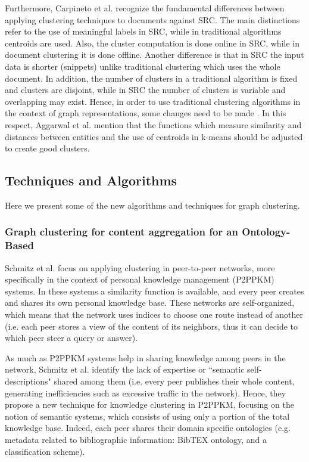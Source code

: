 \documentclass[runningheads]{llncs}
\begin{document}
Furthermore, Carpineto et al. \cite{Carpineto} recognize the fundamental differences between applying clustering techniques to documents against SRC. The main distinctions refer to the use of meaningful labels in SRC, while in traditional algorithms centroids are used. Also, the cluster computation is done online in SRC, while in document clustering it is done offline. Another difference is that in SRC the input data is shorter (snippets) unlike traditional clustering which uses the whole document. In addition, the number of clusters in a traditional algorithm is fixed and clusters are disjoint, while in SRC the number of clusters is variable and overlapping may exist. Hence, in order to use traditional clustering algorithms in the context of graph representations, some changes need to be made \cite{Aggarwal}. In this respect, Aggarwal et al. \cite{Aggarwal} mention that the functions which measure similarity and distances between entities and the use of centroids in k-means should be adjusted to create good clusters.

\subsection{Techniques and Algorithms}\label{algorithms}
Here we present some of the new algorithms and techniques for graph clustering.

\subsubsection{Graph clustering for content aggregation for an Ontology-Based}\label{content-aggregation}
Schmitz et al. \cite{Schmitz} focus on applying clustering in peer-to-peer networks, more specifically in the context of personal knowledge management (P2PPKM) systems. In these systems a similarity function is available, and every peer creates and shares its own personal knowledge base. These networks are self-organized, which means that the network uses indices to choose one route instead of another (i.e. each peer stores a view of the content of its neighbors, thus it can decide to which peer steer a query or answer).

As much as P2PPKM systems help in sharing knowledge among peers in the network, Schmitz et al. \cite{Schmitz} identify the lack of expertise or ``semantic self-descriptions" shared among them (i.e. every peer publishes their whole content, generating inefficiencies such as excessive traffic in the network). Hence, they propose a new technique for knowledge clustering in P2PPKM, focusing on the notion of semantic systems, which consists of using only a portion of the total knowledge base. Indeed, each peer shares their domain specific ontologies (e.g. metadata related to bibliographic information: BibTEX ontology, and a classification scheme). 
\end{document}
